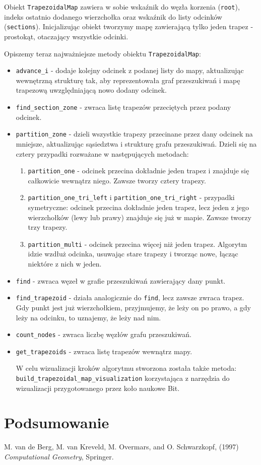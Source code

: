 \documentclass[11pt,a4paper]{article}
\begin{document}
Obiekt \verb|TrapezoidalMap| zawiera w sobie wskaźnik do
węzła korzenia (\verb|root|), indeks ostatnio dodanego wierzchołka
oraz wskaźnik do listy odcinków (\verb|sections|). Inicjalizując
obiekt tworzymy mapę zawierającą tylko jeden trapez - prostokąt,
otaczający wszystkie odcinki.

Opiszemy teraz najważniejsze metody obiektu \verb|TrapezoidalMap|:
\begin{itemize}
    \item \verb|advance_i| - dodaje kolejny odcinek z podanej 
    listy do mapy, aktualizując wewnętrzną strukturę tak, aby
    reprezentowała graf przeszukiwań i mapę trapezową uwzględniającą
    nowo dodany odcinek.
    \item \verb|find_section_zone| - zwraca listę trapezów
    przeciętych przez podany odcinek.
    \item \verb|partition_zone| - dzieli wszystkie trapezy
    przecinane przez dany odcinek na mniejsze, aktualizując
    sąsiedztwa i strukturę grafu przeszukiwań. Dzieli się 
    na cztery przypadki rozważane w następujących metodach:
    \begin{enumerate}
        \item \verb|partition_one| - odcinek przecina dokładnie
        jeden trapez i znajduje się całkowicie wewnątrz niego.
        Zawsze tworzy cztery trapezy.
        \item \verb|partition_one_tri_left| i \verb|partition_one_tri_right| -
        przypadki symetryczne: odcinek przecina dokładnie jeden trapez,
        lecz jeden z jego wierzchołków (lewy lub prawy) znajduje się już
        w mapie. Zawsze tworzy trzy trapezy.
        \item \verb|partition_multi| - odcinek przecina więcej niż jeden
        trapez. Algorytm idzie wzdłuż odcinka, usuwając stare trapezy
        i tworząc nowe, łącząc niektóre z nich w jeden.
    \end{enumerate}
    \item \verb|find| - zwraca węzeł w grafie przeszukiwań
    zawierający dany punkt.
    \item \verb|find_trapezoid| - działa analogicznie do \verb|find|,
    lecz zawsze zwraca trapez. Gdy punkt jest już wierzchołkiem,
    przyjmujemy, że leży on po prawo, a gdy leży na odcinku, to uznajemy,
    że leży nad nim.
    \item \verb|count_nodes| - zwraca liczbę węzłów grafu przeszukiwań.
    \item \verb|get_trapezoids| - zwraca listę trapezów wewnątrz mapy.

W celu wizualizacji kroków algorytmu stworzona została także
metoda: \\ 
\verb|build_trapezoidal_map_visualization| korzystająca 
z narzędzia do wizualizacji przygotowanego przez koło naukowe Bit.
\end{itemize}

\section{Podsumowanie}

\begin{thebibliography}{999}
    M. van de Berg, M. van Kreveld, M. Overmars, and O. Schwarzkopf,
    (1997)
    \emph{Computational Geometry},
    Springer.
\end{thebibliography}
\end{document}
